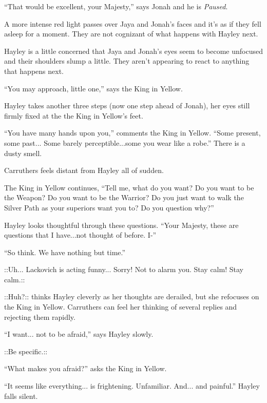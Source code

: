 ``That would be excellent, your Majesty,'' says Jonah and he is \textit{Paused}.





A more intense red light passes over Jaya and Jonah's faces and it's as if they fell asleep for a moment.  They are not cognizant of what happens with Hayley next.  



Hayley is a little concerned that Jaya and Jonah's eyes seem to become unfocused and their shoulders slump a little.  They aren't appearing to react to anything that happens next.



``You may approach, little one,'' says the King in Yellow.

Hayley takes another three steps (now one step ahead of Jonah), her eyes still firmly fixed at the the King in Yellow's feet.

``You have many hands upon you,'' comments the King in Yellow.  ``Some present, some past... Some barely perceptible...some you wear like a robe.''  There is a dusty smell.

Carruthers feels distant from Hayley all of sudden.

The King in Yellow continues, ``Tell me, what do you want?  Do you want to be the Weapon?  Do you want to be the Warrior?  Do you just want to walk the Silver Path as your superiors want you to?  Do you question why?''

Hayley looks thoughtful through these questions.  ``Your Majesty, these are questions that I have...not thought of before.  I-''

``So think.  We have nothing but time.''

 {\color[RGB]{153,0,255}::Uh... Lackovich is acting funny... Sorry!  Not to alarm you.  Stay calm!  Stay calm.::} 

 {\color[RGB]{255,153,0}::Huh?::}  thinks Hayley cleverly as her thoughts are derailed, but she refocuses on the King in Yellow.  Carruthers can feel her thinking of several replies and rejecting them rapidly.

``I want... not to be afraid,'' says Hayley slowly.

 {\color[RGB]{153,0,255}::Be specific.::} 

``What makes you afraid?'' asks the King in Yellow.

``It seems like everything... is frightening.  Unfamiliar.  And... and painful.''  Hayley falls silent.

